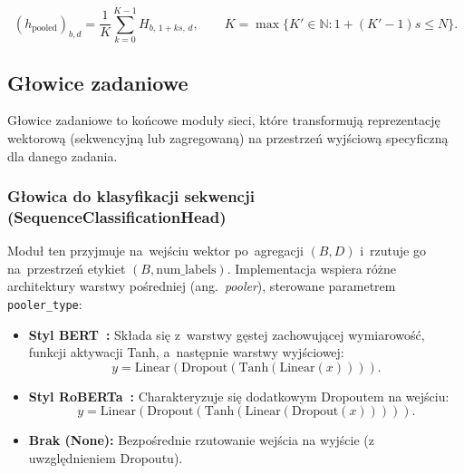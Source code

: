 \documentclass[a4paper,11pt,twoside]{report}
\theoremstyle{definition}
\begin{document}
\begin{equation}
(h_{\text{pooled}})_{b,d}
=
\frac{1}{K}
\sum_{k=0}^{K-1} H_{b,\,1+ks,\,d},
\qquad
K = \max\{K' \in \mathbb{N} : 1+(K'-1)s \le N\}.
\end{equation}









\subsection{Głowice zadaniowe}

Głowice zadaniowe to końcowe moduły sieci, które transformują reprezentację wektorową (sekwencyjną lub zagregowaną) na przestrzeń wyjściową specyficzną dla danego zadania.



\subsubsection{Głowica do klasyfikacji sekwencji (SequenceClassificationHead)}
Moduł ten przyjmuje na~wejściu wektor po~agregacji $(B, D)$ i~rzutuje go na~przestrzeń etykiet $(B, \text{num\_labels})$. Implementacja wspiera różne architektury warstwy pośredniej (ang.\ \emph{pooler}), sterowane parametrem \texttt{pooler\_type}:

\begin{itemize}
    \item \textbf{Styl BERT~\cite{devlin2019bert}:} Składa się z~warstwy gęstej zachowującej wymiarowość, funkcji aktywacji Tanh, a~następnie warstwy wyjściowej:
    \begin{equation}
    y = \text{Linear}(\text{Dropout}(\text{Tanh}(\text{Linear}(x)))).
    \end{equation}
    \item \textbf{Styl RoBERTa~\cite{liu2019roberta}:} Charakteryzuje się dodatkowym Dropoutem na wejściu:
    \begin{equation}
    y = \text{Linear}(\text{Dropout}(\text{Tanh}(\text{Linear}(\text{Dropout}(x))))).
    \end{equation}
    \item \textbf{Brak (None):} Bezpośrednie rzutowanie wejścia na wyjście (z uwzględnieniem Dropoutu).
\end{itemize}
\end{document}
